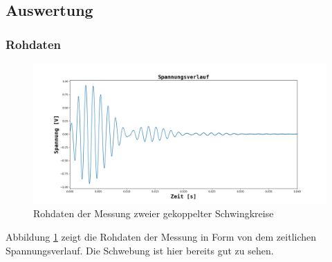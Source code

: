 \documentclass[12pt,a4paper]{article}
\begin{document}
\subsection{Auswertung}
\subsubsection{Rohdaten}
\begin{figure}
\begin{center}
\includegraphics[scale=0.4]{Bilder/Schwebung_Rohdaten.png}
\end{center}
\caption[Rohdaten Schwebung]{Rohdaten der Messung zweier gekoppelter Schwingkreise}
\label{fig:Schwebung_Roh}
\end{figure}
Abbildung \ref{fig:Schwebung_Roh} zeigt die Rohdaten der Messung in Form von dem zeitlichen Spannungsverlauf. Die Schwebung ist hier bereits gut zu sehen.  
\end{document}
